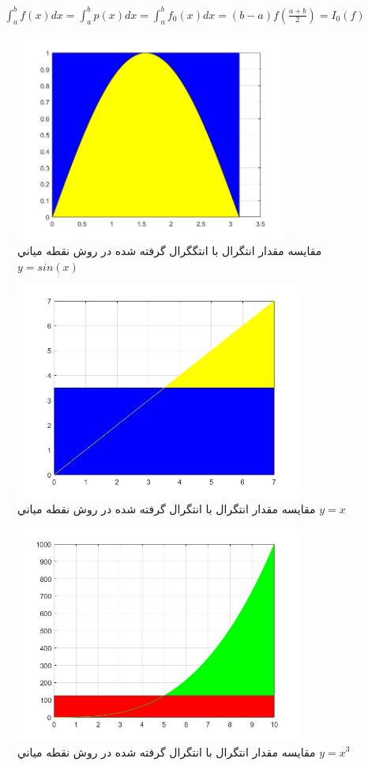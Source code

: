 \documentclass{article}
\begin{document}
\begin{align*}
    \int_a^{b} f(x)dx = \int_a^{b} p(x) dx  = \int_a^{b} f_{0}(x) dx = (b-a) f(\frac{a+b}{2}) =I_{0}(f)    
\end{align*}
        
\begin{figure}[!h]
    \centering
\includegraphics[width=9cm]{piccode24Integeral.jpg}
    \caption{  مقايسه مقدار انتگرال با انتگگرال گرفته شده در روش نقطه مياني $y=sin(x)$  }
    \label{fig:انتگرال خط}
\end{figure}

\begin{figure}[!h]
    \centering
\includegraphics[width=9.5cm]{pic25codeIntegral.jpg}
    \caption{  مقايسه مقدار انتگرال با انتگرال گرفته شده در روش نقطه مياني $y=x$  }
    \label{fig:انتگرال خط}
\end{figure}

\begin{figure}[!h]
    \centering
\includegraphics[width=9.5cm]{pic26codeIntegral.jpg}
    \caption{  مقايسه مقدار انتگرال با انتگرال گرفته شده در روش نقطه مياني $y=x^3$  }
    \label{fig:انتگرال خط}
\end{figure}
\end{document}
